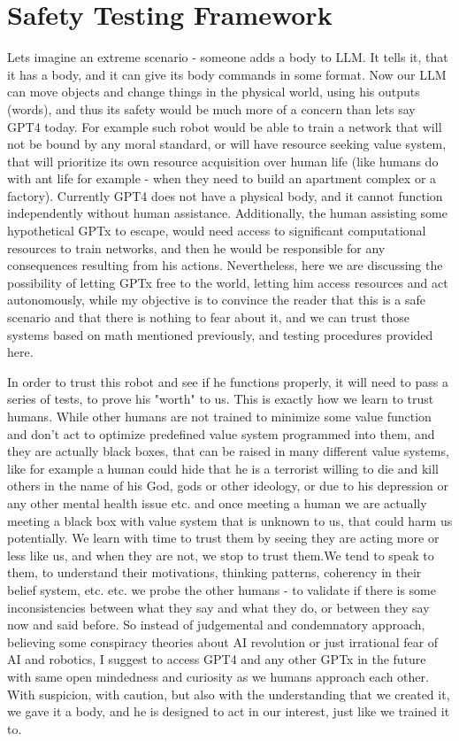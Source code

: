 \documentclass{article}
\begin{document}
\section{Safety Testing Framework}

Lets imagine an extreme scenario - someone adds a body to LLM. It tells it, that it has a body, and it can give its body commands in some format. Now our LLM can move objects and change things in the physical world, using his outputs (words), and thus its safety would be much more of a concern than lets say GPT4 today. For example such robot would be able to train a network that will not be bound by any moral standard, or will have resource seeking value system, that will prioritize its own resource acquisition over human life (like humans do with ant life for example - when they need to build an apartment complex or a factory). Currently GPT4 does not have a physical body, and it cannot function independently without human assistance. Additionally, the human assisting some hypothetical GPTx to escape, would need access to significant computational resources to train networks, and then he would be responsible for any consequences resulting from his actions.  Nevertheless, here we are discussing the possibility of letting GPTx free to the world, letting him access resources and act autonomously, while my objective is to convince the reader that this is a safe scenario and that there is nothing to fear about it, and we can trust those systems based on math mentioned previously, and testing procedures provided here.

In order to trust this robot and see if he functions properly, it will need to pass a series of tests, to prove his "worth" to us. This is exactly how we learn to trust humans. While other humans are not trained to minimize some value function and don't act to optimize predefined value system programmed into them, and they are actually black boxes, that can be raised in many different value systems, like for example a human could hide that he is a terrorist willing to die and kill others in the name of his God, gods or other ideology, or due to his depression or any other mental health issue etc. and once meeting a human we are actually meeting a black box with value system that is unknown to us, that could harm us potentially. We learn with time to trust them by seeing they are acting more or less like us, and when they are not, we stop to trust them.We tend to speak to them, to understand their motivations, thinking patterns, coherency in their belief system, etc. etc. we probe the other humans - to validate if there is some inconsistencies between what they say and what they do, or between they say now and said before. So instead of judgemental and condemnatory approach, believing some conspiracy theories about AI revolution or just irrational fear of AI and robotics, I suggest to access GPT4 and any other GPTx in the future with same open mindedness and curiosity as we humans approach each other. With suspicion, with caution, but also with the understanding that we created it, we gave it a body, and he is designed to act in our interest, just like we trained it to.\\
\end{document}

